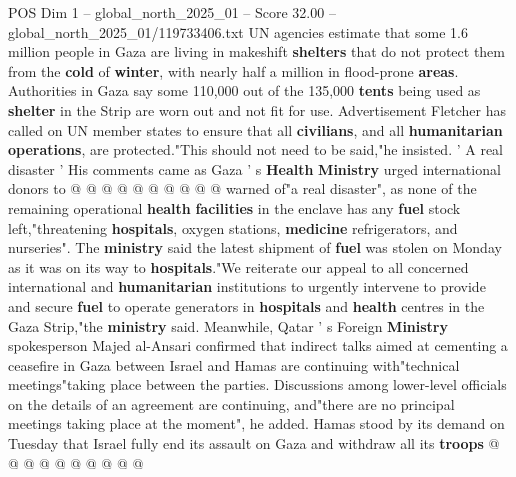 \begin{textsample}{POS Dim 1 – global\_north\_2025\_01 – Score 32.00 – global\_north\_2025\_01/119733406.txt}
UN agencies estimate that some 1.6 million people in Gaza are living in makeshift \textbf{shelters} that do not protect them from the \textbf{cold} of \textbf{winter}, with nearly half a million in flood-prone \textbf{areas}.
Authorities in Gaza say some 110,000 out of the 135,000 \textbf{tents} being used as \textbf{shelter} in the Strip are worn out and not fit for use.
Advertisement Fletcher has called on UN member states to ensure that all \textbf{civilians}, and all \textbf{humanitarian} \textbf{operations}, are protected."This should not need to be said,"he insisted. ' A real disaster ' His comments came as Gaza ' s \textbf{Health} \textbf{Ministry} urged international donors to @ @ @ @ @ @ @ @ @ @ warned of"a real disaster", as none of the remaining operational \textbf{health} \textbf{facilities} in the enclave has any \textbf{fuel} stock left,"threatening \textbf{hospitals}, oxygen stations, \textbf{medicine} refrigerators, and nurseries".
The \textbf{ministry} said the latest shipment of \textbf{fuel} was stolen on Monday as it was on its way to \textbf{hospitals}."We reiterate our appeal to all concerned international and \textbf{humanitarian} institutions to urgently intervene to provide and secure \textbf{fuel} to operate generators in \textbf{hospitals} and \textbf{health} centres in the Gaza Strip,"the \textbf{ministry} said.
Meanwhile, Qatar ' s Foreign \textbf{Ministry} spokesperson Majed al-Ansari confirmed that indirect talks aimed at cementing a ceasefire in Gaza between Israel and Hamas are continuing with"technical meetings"taking place between the parties.
Discussions among lower-level officials on the details of an agreement are continuing, and"there are no principal meetings taking place at the moment", he added.
Hamas stood by its demand on Tuesday that Israel fully end its assault on Gaza and withdraw all its \textbf{troops} @ @ @ @ @ @ @ @ @ @

\end{textsample}
